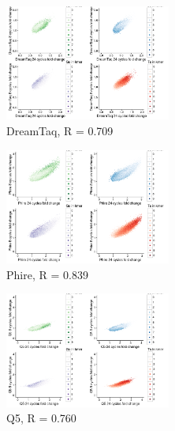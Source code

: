 \documentclass[parskip=full, numbers=noenddot]{scrbook}
\begin{document}
\begin{figure}[htbp]
  \centering
  \begin{subfigure}[htbp]{0.6\textwidth}
    \centering
    \includegraphics[width=0.6\textwidth]{kmer_dreamtaq}
    \caption{DreamTaq, R = 0.709}
    \label{fig:kmer_enz_dreamtaq}
  \end{subfigure}
  \begin{subfigure}[htbp]{0.6\textwidth}
    \centering
    \includegraphics[width=0.6\textwidth]{kmer_phire}
    \caption{Phire, R = 0.839}
    \label{fig:kmer_enz_phire}
  \end{subfigure}
  \begin{subfigure}[htbp]{0.6\textwidth}
    \centering
    \includegraphics[width=0.6\textwidth]{kmer_q5}
    \caption{Q5, R = 0.760}
    \label{fig:kmer_enz_q5}
  \end{subfigure}
  \begin{subfigure}[htbp]{0.6\textwidth}

\end{subfigure}
\end{figure}
\end{document}
